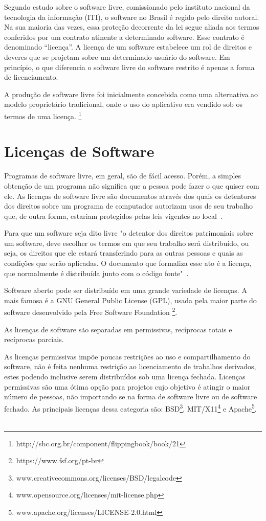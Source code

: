 Segundo estudo sobre o software livre, comissionado pelo instituto nacional da 
tecnologia da informação (ITI), o software no Brasil é regido pelo direito autoral. 
Na sua maioria das vezes, essa proteção decorrente da lei segue aliada aos termos 
conferidos por um contrato atinente a determinado software. Esse contrato é 
denominado “licença”. A licença de um software estabelece um rol de direitos e 
deveres que se projetam sobre um determinado usuário do software. Em princípio, 
o que diferencia o software livre do software restrito é apenas a forma de
licenciamento. \cite{kon2012software}

A produção de software livre foi inicialmente concebida como
uma alternativa ao modelo proprietário tradicional, onde o uso
do aplicativo era vendido sob os termos de uma licença. \footnote{http://sbc.org.br/component/flippingbook/book/21}


\section{Licenças de Software}

Programas de software livre, em geral, são de fácil acesso. Porém, a simples obtenção
de um programa não significa que a pessoa pode fazer o que quiser com ele. As licenças
de software livre são documentos através dos quais os detentores dos direitos sobre um
programa de computador autorizam usos de seu trabalho que, de outra forma, estariam
protegidos pelas leis vigentes no local~\cite{sabino2009licenccas}.

Para que um software seja dito livre "o detentor dos direitos patrimoniais 
sobre um software, deve escolher os termos em que seu trabalho será distribuído, 
ou seja, os direitos que ele estará transferindo para as outras pessoas e quais as 
condições que serão aplicadas. O documento que formaliza esse ato é a licença, 
que normalmente é distribuída junto com o código fonte"~\cite{sabino2009licenccas}.

Software aberto pode ser distribuído em uma grande variedade de licenças.
A mais famosa é a GNU General Public License (GPL), usada pela maior
parte do software desenvolvido pela Free Software Foundation \footnote{https://www.fsf.org/pt-br}.

As licenças de software são separadas em permissivas, recíprocas totais e recíprocas
parciais.

As licenças permissivas impõe poucas restrições ao uso e compartilhamento do
software, não é feita nenhuma restrição ao licenciamento de trabalhos derivados, 
estes podendo inclusive serem distribuídos sob uma licença fechada. Licenças permissivas são 
uma ótima opção para projetos cujo objetivo é atingir o maior número de pessoas, 
não importando se na forma de software livre ou de software fechado. As principais 
licenças dessa categoria são: BSD\footnote{www.creativecommons.org/licenses/BSD/legalcode},
MIT/X11\footnote{www.opensource.org/licenses/mit-license.php} e Apache\footnote{www.apache.org/licenses/LICENSE-2.0.html}.
~\cite{sabino2009licenccas}


